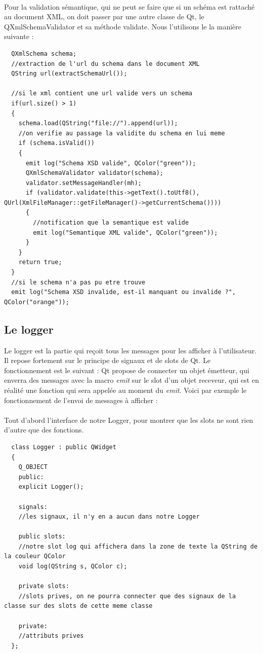 \paragraph{}
Pour la validation sémantique, qui ne peut se faire que si un schéma est rattaché au document XML, on doit passer par une autre classe de Qt, le QXmlSchemaValidator et sa méthode validate. Nous l'utilisons le la manière suivante :
\begin{lstlisting}
  QXmlSchema schema;
  //extraction de l'url du schema dans le document XML
  QString url(extractSchemaUrl());

  //si le xml contient une url valide vers un schema
  if(url.size() > 1)
  {
    schema.load(QString("file://").append(url));
    //on verifie au passage la validite du schema en lui meme
    if (schema.isValid())
    {
      emit log("Schema XSD valide", QColor("green"));
      QXmlSchemaValidator validator(schema);
      validator.setMessageHandler(mh);
      if (validator.validate(this->getText().toUtf8(), QUrl(XmlFileManager::getFileManager()->getCurrentSchema())))
      {
        //notification que la semantique est valide
        emit log("Semantique XML valide", QColor("green"));
      }
    }
    return true;
  }
  //si le schema n'a pas pu etre trouve
  emit log("Schema XSD invalide, est-il manquant ou invalide ?", QColor("orange"));
\end{lstlisting}
\paragraph{}
\subsection{Le logger}
Le logger est la partie qui reçoit tous les messages pour les afficher à l'utilisateur. Il repose fortement sur le principe de signaux et de slots de Qt. Le fonctionnement est le suivant : Qt propose de connecter un objet émetteur, qui enverra des messages avec la macro \textit{emit} sur le slot d'un objet receveur, qui est en réalité une fonction qui sera appelée au moment du \textit{emit}. Voici par exemple le fonctionnement de l'envoi de messages à afficher :

\paragraph{}
Tout d'abord l'interface de notre Logger, pour montrer que les slots ne sont rien d'autre que des fonctions.
\begin{lstlisting}
  class Logger : public QWidget
  {
    Q_OBJECT
    public:
    explicit Logger();
    
    signals:
    //les signaux, il n'y en a aucun dans notre Logger
    
    public slots:
    //notre slot log qui affichera dans la zone de texte la QString de la couleur QColor
    void log(QString s, QColor c);

    private slots:
    //slots prives, on ne pourra connecter que des signaux de la classe sur des slots de cette meme classe

    private:
    //attributs prives
  };
\end{lstlisting}
